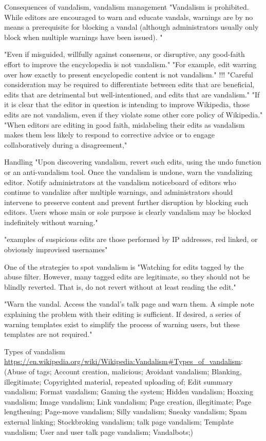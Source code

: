 \documentclass{sigchi}
\begin{document}
Consequences of vandalism, vandalism management
"Vandalism is prohibited. While editors are encouraged to warn and educate vandals, warnings are by no means a prerequisite for blocking a vandal (although administrators usually only block when multiple warnings have been issued). "

"Even if misguided, willfully against consensus, or disruptive, any good-faith effort to improve the encyclopedia is not vandalism."
"For example, edit warring over how exactly to present encyclopedic content is not vandalism." !!!
"Careful consideration may be required to differentiate between edits that are beneficial, edits that are detrimental but well-intentioned, and edits that are vandalism."
"If it is clear that the editor in question is intending to improve Wikipedia, those edits are not vandalism, even if they violate some other core policy of Wikipedia."
"When editors are editing in good faith, mislabeling their edits as vandalism makes them less likely to respond to corrective advice or to engage collaboratively during a disagreement,"

Handling
"Upon discovering vandalism, revert such edits, using the undo function or an anti-vandalism tool. Once the vandalism is undone, warn the vandalizing editor. Notify administrators at the vandalism noticeboard of editors who continue to vandalize after multiple warnings, and administrators should intervene to preserve content and prevent further disruption by blocking such editors. Users whose main or sole purpose is clearly vandalism may be blocked indefinitely without warning."

"examples of suspicious edits are those performed by IP addresses, red linked, or obviously improvised usernames"

One of the strategies to spot vandalism is "Watching for edits tagged by the abuse filter. However, many tagged edits are legitimate, so they should not be blindly reverted. That is, do not revert without at least reading the edit."

"Warn the vandal. Access the vandal's talk page and warn them. A simple note explaining the problem with their editing is sufficient. If desired, a series of warning templates exist to simplify the process of warning users, but these templates are not required."

Types of vandalism \url{https://en.wikipedia.org/wiki/Wikipedia:Vandalism#Types_of_vandalism}:
  (Abuse of tags; Account creation, malicious; Avoidant vandalism; Blanking, illegitimate; Copyrighted material, repeated uploading of; Edit summary vandalism; Format vandalism; Gaming the system; Hidden vandalism; Hoaxing vandalism; Image vandalism; Link vandalism; Page creation, illegitimate; Page lengthening; Page-move vandalism; Silly vandalism; Sneaky vandalism; Spam external linking; Stockbroking vandalism; talk page vandalism; Template vandalism; User and user talk page vandalism; Vandalbots;)
\end{document}
